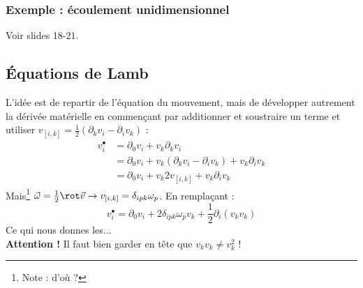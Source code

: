 \subsubsection{Exemple : écoulement unidimensionnel}
Voir slides 18-21.
	
\subsection{Équations de Lamb}
L'idée est de repartir de l'équation du mouvement, mais de développer autrement 
la dérivée matérielle en commençant par additionner et soustraire un terme et utiliser
$v_{[i,k]} = \frac{1}{2}(\partial_kv_i - \partial_iv_k)$ :
\begin{equation}
	\begin{array}{ll}
		v_i^\bullet & = \partial_0v_i + v_k\partial_kv_i                                    \\
		            & = \partial_0v_i + v_k(\partial_kv_i - \partial_iv_k)+v_k\partial_iv_k \\
		            & = \partial_0v_i + v_k 2 v_{[i,k]} + v_k\partial_iv_k                  
	\end{array}
\end{equation}
Mais\footnote{Note : d'où ?} $\vec{\omega} = \frac{1}{2}\rot \vec{v} \rightarrow 
v_{[i,k]} = \delta_{ipk}\omega_p$. En remplaçant :
\begin{equation}
	v_i^\bullet = \partial_0v_i + 2 \delta_{ipk} \omega_p v_k + \frac{1}{2}\partial_i
	(v_kv_k)
\end{equation}
Ce qui nous donnes les...\\
	
\textbf{Attention !} Il faut bien garder en tête que $v_kv_k \neq v_k^2$ !
	
